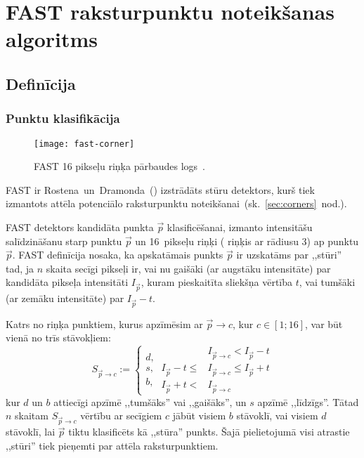 \section{FAST raksturpunktu noteikšanas algoritms} \label{sec:fast}
\setcounter{lstlisting}{0} %

\newcommand{\Ip}{I_{\vec{p}}}
\newcommand{\Ipc}{ {I_{\vec{p} \to c}} }
\newcommand{\Spc}{ {S_{\vec{p} \to c}} }

\subsection{Definīcija} \label{sec:fast-def}
\subsubsection{Punktu klasifikācija}

\begin{figure}[tbh]
	\centering
	\texttt{[image: fast-corner]}
	\caption{FAST 16 pikseļu riņķa pārbaudes logs~\cite{FAST}.}
	\label{fig:fast}
\end{figure}

FAST ir Rostena~un~Dramonda\cite{FAST}~()
izstrādāts stūru detektors, kurš tiek izmantots attēla potenciālo 
raksturpunktu noteikšanai~(sk.~\ref{sec:corners}~nod.).

FAST detektors kandidāta punkta $\vec{p}$ klasificēšanai, izmanto intensitāšu
salīdzināšanu starp punktu $\vec{p}$ un 16~pikseļu riņķi ( riņķis
ar rādiusu 3) ap punktu $\vec{p}$. 
FAST definīcija nosaka, ka apskatāmais punkts $\vec{p}$ ir uzskatāms par
,,stūri'' tad, ja $n$ skaita secīgi pikseļi ir, vai nu gaišāki
(ar augstāku intensitāte) par kandidāta pikseļa intensitāti $\Ip$, kuram
pieskaitīta sliekšņa vērtība $t$, vai tumšāki (ar zemāku intensitāte) par
$\Ip - t$. \cite{Rosten-tracking}\cite{FAST}

Katrs no riņķa punktiem, kurus apzīmēsim ar $\vec{p}\to c$, kur $c \in [1; 16]$,
var būt vienā no trīs stāvokļiem:
\begin{equation}\label{eq:fast}
	\Spc := \left\{
		\begin{array}{c} d\text{,}\\ s\text{,}\\ b\text{,} \end{array}
		\begin{aligned}
			           & \Ipc < \Ip-t \\
			\Ip-t \leq & \Ipc \leq \Ip+t \\
			   \Ip+t < & \Ipc
		\end{aligned}
		\right.
\end{equation}
kur $d$ un $b$ attiecīgi apzīmē ,,tumšāks'' vai ,,gaišāks'', un $s$ apzīmē
,,līdzīgs''. Tātad $n$ skaitam $\Spc$ vērtību ar secīgiem $c$ jābūt visiem
$b$ stāvoklī, vai visiem $d$ stāvoklī, lai $\vec{p}$ tiktu klasificēts kā
,,stūra'' punkts. Šajā pielietojumā visi atrastie ,,stūri'' tiek pieņemti
par attēla raksturpunktiem.

